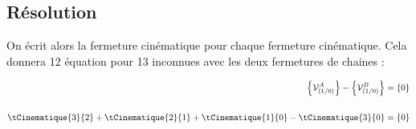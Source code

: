 \documentclass[10pt,fleqn]{article} %
\begin{document}
\begin{multicols}{2}
\begin{multicols}{2}
\begin{itemize}
\end{itemize}

\subsection{Résolution}
On écrit alors la fermeture cinématique pour chaque fermeture cinématique. Cela donnera 12 équation pour 13 inconnues avec les deux fermetures de chaines :

		\begin{align*}
		\torseur{\mathcal{V}^{A}_{(1/0)}}-\torseur{\mathcal{V}^{B}_{(1/0)}}=\left\{0\right\}\\
		\\
				\tCinematique{3}{2}
						+	\tCinematique{2}{1}	
						+	\tCinematique{1}{0}-\tCinematique{3}{0}	=\left\{0\right\}
		\end{align*}



\end{multicols}
\end{multicols}
\end{document}

